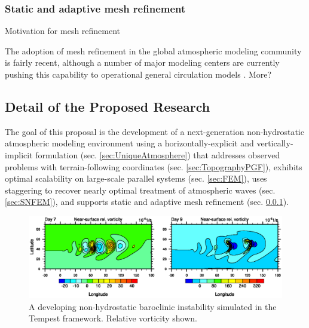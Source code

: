 \documentclass[11pt]{article}
\begin{document}
\subsubsection{Static and adaptive mesh refinement} \label{sec:Refinement}

{\color{blue} Motivation for mesh refinement}

The adoption of mesh refinement in the global atmospheric modeling community is fairly recent, although a number of major modeling centers are currently pushing this capability to operational general circulation models \citep{WCSJBKMGDLDFSHPTDR2012MWR, LMHSJL2013MWR, CMZCJMAT2013MWR}.  {\color{blue} More?}

\subsection{Detail of the Proposed Research} \label{sec:Research}

The goal of this proposal is the development of a next-generation non-hydrostatic atmospheric modeling environment using a horizontally-explicit and vertically-implicit formulation (sec. \ref{sec:UniqueAtmosphere}) that addresses observed problems with terrain-following coordinates (sec. \ref{sec:TopographyPGF}), exhibits optimal scalability on large-scale parallel systems (sec. \ref{sec:FEM}), uses staggering to recover nearly optimal treatment of atmospheric waves (sec. \ref{sec:SNFEM}), and supports static and adaptive mesh refinement (sec. \ref{sec:Refinement}).

\begin{figure}
\begin{center}
\includegraphics[width=6in]{UMJSTest-Results}
\end{center}
\caption{A developing non-hydrostatic baroclinic instability simulated in the Tempest framework.  Relative vorticity shown.} \label{fig:TempestBaroclinicInstability}
\end{figure}
\end{document}
